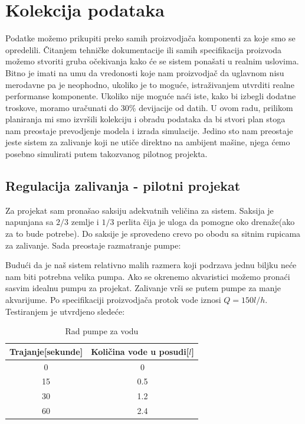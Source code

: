 \documentclass[a4paper,11pt]{book}
\begin{document}
\section{Kolekcija podataka}

Podatke možemo prikupiti preko samih proizvodjača komponenti za koje smo se opredelili. Čitanjem tehničke dokumentacije ili samih specifikacija proizvoda možemo stvoriti gruba očekivanja kako će se sistem ponašati u realnim uslovima. \\

\noindent Bitno je imati na umu da vredonosti koje nam proizvodjač da uglavnom nisu merodavne pa je neophodno, ukoliko je to moguće, istraživanjem utvrditi realne performanse komponente. Ukoliko nije moguće naći iste, kako bi izbegli dodatne troskove, moramo uračunati do 30\% devijacije od datih. U ovom radu, prilikom planiranja mi smo izvršili kolekciju i obradu podataka da bi stvori plan stoga nam preostaje prevodjenje modela i izrada simulacije. Jedino sto nam preostaje jeste sistem za zalivanje koji ne utiče direktno na ambijent mašine, njega ćemo posebno simulirati putem takozvanog pilotnog projekta. 

\subsection{Regulacija zalivanja - pilotni projekat}

Za projekat sam pronašao saksiju adekvatnih veličina za sistem. Saksija je napunjana sa $2/3$ zemlje i $1/3$ perlita čija je uloga da pomogne oko drenaže(ako za to bude potrebe). Do saksije je sprovedeno crevo po obodu sa sitnim rupicama za zalivanje. Sada preostaje razmatranje pumpe:

Budući da je naš sistem relativno malih razmera koji podrzava jednu biljku neće nam biti potrebna velika pumpa. Ako se okrenemo akvaristici možemo pronaći sasvim idealnu pumpu za projekat. 
Zalivanje vrši se putem pumpe za manje akvarijume. Po specifikaciji proizvodjača protok vode iznosi $Q = 150 l/h$. Testiranjem je utvrdjeno sledeće:

\begin{table}[ht]
  \caption{Rad pumpe za vodu}
  \centering
  \begin{tabular}{|c|c|}
  \hline
    Trajanje[sekunde] & Količina vode u posudi[$l$]\\ \hline
  0 & 0 \\ \hline
  15 & 0.5 \\ \hline
  30 & 1.2 \\ \hline
  60 & 2.4 \\ \hline
  \end{tabular}
\end{table}
\end{document}
